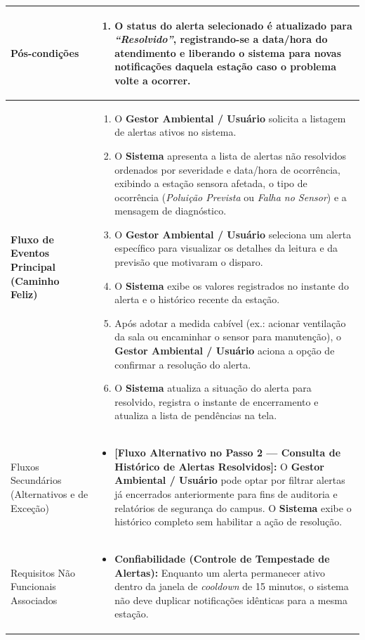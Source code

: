 \documentclass[11pt, a4paper]{article}
\begin{document}
\begin{longtable}{|>{\bfseries}p{3.8cm}|p{12.4cm}|}
Pós-condições & 
\begin{enumerate}[nosep, leftmargin=0.5cm]
    \item O status do alerta selecionado é atualizado para \emph{``Resolvido''}, registrando-se a data/hora do atendimento e liberando o sistema para novas notificações daquela estação caso o problema volte a ocorrer.
\end{enumerate} \\ \hline

Fluxo de Eventos Principal (Caminho Feliz) & 
\begin{enumerate}[nosep, leftmargin=0.5cm]
    \item O \textbf{Gestor Ambiental / Usuário} solicita a listagem de alertas ativos no sistema.
    \item O \textbf{Sistema} apresenta a lista de alertas não resolvidos ordenados por severidade e data/hora de ocorrência, exibindo a estação sensora afetada, o tipo de ocorrência (\emph{Poluição Prevista} ou \emph{Falha no Sensor}) e a mensagem de diagnóstico.
    \item O \textbf{Gestor Ambiental / Usuário} seleciona um alerta específico para visualizar os detalhes da leitura e da previsão que motivaram o disparo.
    \item O \textbf{Sistema} exibe os valores registrados no instante do alerta e o histórico recente da estação.
    \item Após adotar a medida cabível (ex.: acionar ventilação da sala ou encaminhar o sensor para manutenção), o \textbf{Gestor Ambiental / Usuário} aciona a opção de confirmar a resolução do alerta.
    \item O \textbf{Sistema} atualiza a situação do alerta para resolvido, registra o instante de encerramento e atualiza a lista de pendências na tela.
\end{enumerate} \\ \hline

Fluxos Secundários (Alternativos e de Exceção) & 
\begin{itemize}[nosep, leftmargin=0.5cm]
    \item \textbf{[Fluxo Alternativo no Passo 2 --- Consulta de Histórico de Alertas Resolvidos]:} O \textbf{Gestor Ambiental / Usuário} pode optar por filtrar alertas já encerrados anteriormente para fins de auditoria e relatórios de segurança do campus. O \textbf{Sistema} exibe o histórico completo sem habilitar a ação de resolução.
\end{itemize} \\ \hline

Requisitos Não Funcionais Associados & 
\begin{itemize}[nosep, leftmargin=0.5cm]
    \item \textbf{Confiabilidade (Controle de Tempestade de Alertas):} Enquanto um alerta permanecer ativo dentro da janela de \emph{cooldown} de 15 minutos, o sistema não deve duplicar notificações idênticas para a mesma estação.
\end{itemize} \\ \hline
\end{longtable}
\end{document}
